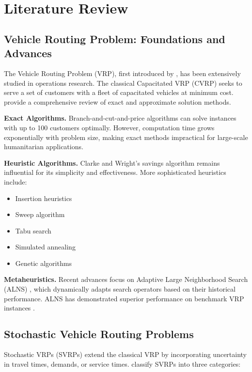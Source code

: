 \section{Literature Review}
\label{sec:literature_review}

\subsection{Vehicle Routing Problem: Foundations and Advances}

The Vehicle Routing Problem (VRP), first introduced by \cite{Dantzig1959}, has been extensively studied in operations research. The classical Capacitated VRP (CVRP) seeks to serve a set of customers with a fleet of capacitated vehicles at minimum cost. \cite{Toth2014} provide a comprehensive review of exact and approximate solution methods.

\textbf{Exact Algorithms.} Branch-and-cut-and-price algorithms \cite{Fukasawa2006} can solve instances with up to 100 customers optimally. However, computation time grows exponentially with problem size, making exact methods impractical for large-scale humanitarian applications.

\textbf{Heuristic Algorithms.} Clarke and Wright's savings algorithm \cite{Clarke1964} remains influential for its simplicity and effectiveness. More sophisticated heuristics include:
\begin{itemize}
\item Insertion heuristics \cite{Solomon1987}
\item Sweep algorithm \cite{Gillett1974}
\item Tabu search \cite{Gendreau1994}
\item Simulated annealing \cite{Osman1993}
\item Genetic algorithms \cite{Potvin1996}
\end{itemize}

\textbf{Metaheuristics.} Recent advances focus on Adaptive Large Neighborhood Search (ALNS) \cite{Ropke2006}, which dynamically adapts search operators based on their historical performance. ALNS has demonstrated superior performance on benchmark VRP instances \cite{Pisinger2010}.

\subsection{Stochastic Vehicle Routing Problems}

Stochastic VRPs (SVRPs) extend the classical VRP by incorporating uncertainty in travel times, demands, or service times. \cite{Gendreau2014} classify SVRPs into three categories:

